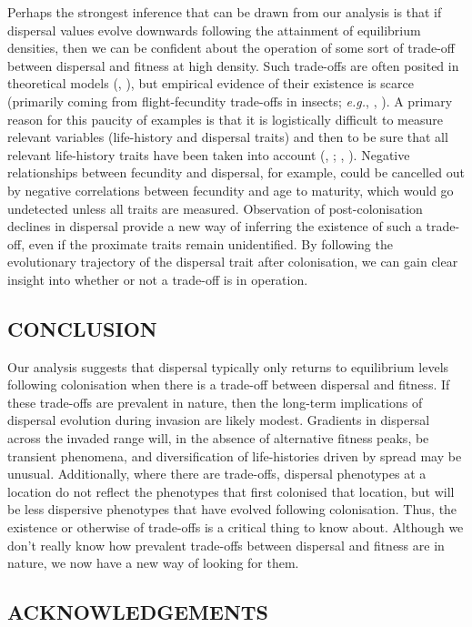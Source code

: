 \documentclass[11pt]{article}
\newcommand{\eg}{{\em e.g.}, }
\newcommand{\CiteP}[1]{(\citeauthor{#1}, \citeyear{#1})}
\newcommand{\Cite}[1]{\citeauthor{#1}, \citeyear{#1}}
\begin{document}
Perhaps the strongest inference that can be drawn from our analysis is that if dispersal values evolve downwards following the attainment of equilibrium densities, then we can be confident about the operation of some sort of trade-off between dispersal and fitness at high density. Such trade-offs are often posited in theoretical models \CiteP{Ronce2007}, but empirical evidence of their existence is scarce (primarily coming from flight-fecundity trade-offs in insects; \eg \Cite{Hughes2003b}). A primary reason for this paucity of examples is that it is logistically difficult to measure relevant variables (life-history and dispersal traits) and then to be sure that all relevant life-history traits have been taken into account (\Cite{Ronce2007}; \Cite{Phillips2010}). Negative relationships between fecundity and dispersal, for example, could be cancelled out by negative correlations between fecundity and age to maturity, which would go undetected unless all traits are measured.  Observation of post-colonisation declines in dispersal provide a new way of inferring the existence of such a trade-off, even if the proximate traits remain unidentified. By following the evolutionary trajectory of the dispersal trait after colonisation, we can gain clear insight into whether or not a trade-off is in operation.


\subsection*{CONCLUSION}

Our analysis suggests that dispersal typically only returns to equilibrium levels following colonisation when there is a trade-off between dispersal and fitness. If these trade-offs are prevalent in nature, then the long-term implications of dispersal evolution during invasion are likely modest. Gradients in dispersal across the invaded range will, in the absence of alternative fitness peaks, be transient phenomena, and diversification of life-histories driven by spread may be unusual. Additionally, where there are trade-offs, dispersal phenotypes at a location do not reflect the phenotypes that first colonised that location, but will be less dispersive phenotypes that have evolved following colonisation. Thus, the existence or otherwise of trade-offs is a critical thing to know about.  Although we don't really know how prevalent trade-offs between dispersal and fitness are in nature, we now have a new way of looking for them.


\subsection*{ACKNOWLEDGEMENTS}
\end{document}
